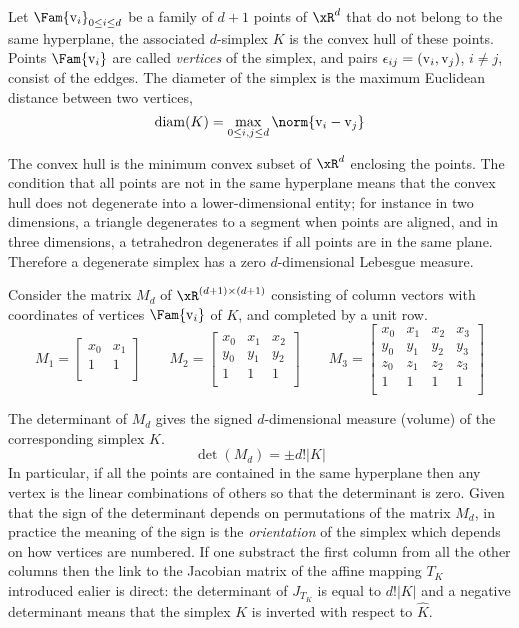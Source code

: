 \begin{dfntn}[Simplex]
Let $\Fam{\vertex_i}_{0\leq i\leq d}$ be a family of $d + 1$ points of $\xR^d$ that do not belong to the same hyperplane, the associated $d$-simplex $K$ is the convex hull of these points.
Points $\Fam{\vertex_i}$ are called \textit{vertices} of the simplex, and pairs $\epsilon_{ij} = ({\mathrm v}_i, {\mathrm v}_j)$, $i\neq j$, consist of the eddges.
The diameter of the simplex is the maximum Euclidean distance between two vertices,
\[
\diam(K) = \displaystyle\max_{0\leq i,j\leq d}\norm{\vertex_i - \vertex_j}
\]
\end{dfntn}

The convex hull is the minimum convex subset of $\xR^d$ enclosing the points.
The condition that all points are not in the same hyperplane means that the convex hull does not degenerate into a lower-dimensional entity; for instance in two dimensions, a triangle degenerates to a segment when points are aligned, and in three dimensions, a tetrahedron degenerates if all points are in the same plane.
Therefore a degenerate simplex has a zero $d$-dimensional Lebesgue measure.

\medskip
Consider the matrix $M_d$ of $\xR^{(d+1)\times(d+1)}$ consisting of column vectors with coordinates of vertices $\Fam{\vertex_i}$ of $K$, and completed by a unit row.
\begin{equation*}
M_1 =
\begin{bmatrix}
x_0 & x_1 \\
1   & 1   \\
\end{bmatrix}
\qquad
M_2 =
\begin{bmatrix}
x_0 & x_1 & x_2 \\
y_0 & y_1 & y_2 \\
1   & 1   & 1   \\
\end{bmatrix}
\qquad
M_3 =
\begin{bmatrix}
x_0 & x_1 & x_2 & x_3 \\
y_0 & y_1 & y_2 & y_3 \\
z_0 & z_1 & z_2 & z_3 \\
1   & 1   & 1   & 1   \\
\end{bmatrix}
\end{equation*}

The determinant of $M_d$ gives the signed $d$-dimensional measure (volume) of the corresponding simplex $K$.
\begin{equation*}
\det(M_d) = \pm d! |K|
\end{equation*}
In particular, if all the points are contained in the same hyperplane then any vertex is the linear combinations of others so that the determinant is zero.
Given that the sign of the determinant depends on permutations of the matrix $M_d$, in practice the meaning of the sign is the \textit{orientation} of the simplex which depends on how vertices are numbered.
If one substract the first column from all the other columns then the link to the Jacobian matrix of the affine mapping $T_K$ introduced ealier is direct: the determinant of $J_{T_K}$ is equal to $d! |K|$ and a negative determinant means that the simplex $K$ is inverted with respect to $\hat K$.


